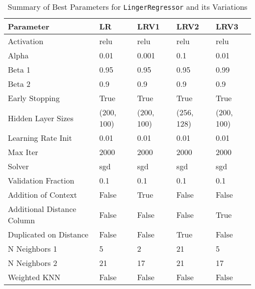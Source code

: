 \documentclass[a4paper, 12pt]{report}
\begin{document}
\begin{table}[H]
    \centering
    \caption{Summary of Best Parameters for \texttt{LingerRegressor} and its Variations}
    \label{tab:best_parameters_summary_exp1}
    \begin{tabular}{|l|l|l|l|l|}
    \hline
    \textbf{Parameter} & \textbf{LR} & \textbf{LRV1} & \textbf{LRV2} & \textbf{LRV3} \\
    \hline
    Activation & relu & relu & relu & relu \\
    Alpha & 0.01 & 0.001 & 0.1 & 0.01 \\
    Beta 1 & 0.95 & 0.95 & 0.95 & 0.99 \\
    Beta 2 & 0.9 & 0.9 & 0.9 & 0.9 \\
    Early Stopping & True & True & True & True \\
    Hidden Layer Sizes & (200, 100) & (200, 100) & (256, 128) & (200, 100) \\
    Learning Rate Init & 0.01 & 0.01 & 0.01 & 0.01 \\
    Max Iter & 2000 & 2000 & 2000 & 2000 \\
    Solver & sgd & sgd & sgd & sgd \\
    Validation Fraction & 0.1 & 0.1 & 0.1 & 0.1 \\
    Addition of Context & False & True & False & False \\
    Additional Distance Column & False & False & False & True \\
    Duplicated on Distance & False & False & True & False \\
    N Neighbors 1 & 5 & 2 & 21 & 5 \\
    N Neighbors 2 & 21 & 17 & 21 & 17 \\
    Weighted KNN & False & False & False & False \\
    \hline
    \end{tabular}
\end{table}
\clearpage
\end{document}

